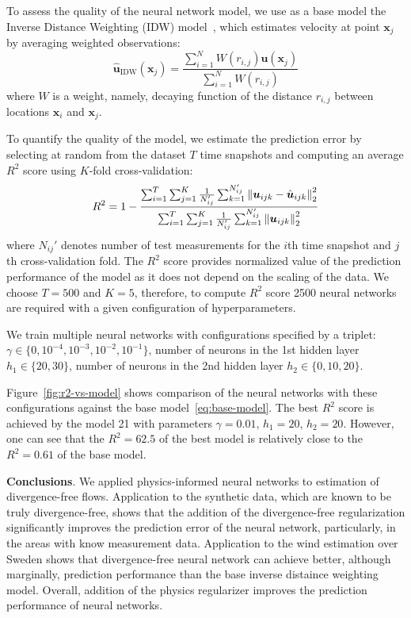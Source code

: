 \documentclass[pamm,a4paper,fleqn]{w-art}
\renewcommand{\vec}[1]{\boldsymbol{#1}}
\newcommand{\norm}[1]{\left\lVert#1\right\rVert}
\begin{document}
To assess the quality of the neural network model, we use as a base model the
Inverse Distance Weighting (IDW)
model~\cite{Cellura2008}, which
estimates velocity at point $\vec x_j$ by averaging weighted observations:
\begin{equation}
  \label{eq:base-model}
  \hat{\vec u}_{\text{IDW}}(\vec x_j) =
  \frac{\sum_{i=1}^N W(r_{i,j}) \vec u(\vec x_j)}{\sum_{i=1}^N W(r_{i,j})}
\end{equation}
where $W$ is a weight, namely, decaying function of the distance $r_{i, j}$
between locations $\vec x_i$ and $\vec x_j$.

To quantify the quality of the model, we estimate the prediction error
by selecting at random from the dataset $T$ time snapshots and computing
an average $R^2$ score using $K$-fold cross-validation:
\[
  R^2 = 1 - \frac{%
    \sum_{i=1}^T \sum_{j=1}^K \frac{1}{N_{ij}'}
    \sum_{k=1}^{N_{ij}'} \norm{\vec{u}_{ijk} - \hat{\vec{u}}_{ijk}}^2_2}
  {%
    \sum_{i=1}^T \sum_{j=1}^K \frac{1}{N_{ij}'}
    \sum_{k=1}^{N_{ij}'} \norm{\vec{u}_{ijk}}^2_2}
\]
where $N_{ij}'$ denotes number of test measurements for the $i$th time snapshot
and $j$th cross-validation fold.
The $R^2$ score provides normalized value of the prediction performance of the
model as it does not depend on the scaling of the data.
We choose $T=500$ and $K=5$, therefore, to compute $R^2$ score 2500 neural
networks are required with a given configuration of hyperparameters.

We train multiple neural networks with configurations specified by a triplet: 
$\gamma \in \{0, 10^{-4}, 10^{-3}, 10^{-2}, 10^{-1}\}$, 
number of neurons in the 1st hidden layer $h_1 \in \{20, 30\}$,
number of neurons in the 2nd hidden layer $h_2 \in \{0, 10, 20\}$.

Figure~\ref{fig:r2-vs-model} shows comparison of the neural networks with these
configurations against the base model~\eqref{eq:base-model}.
The best $R^2$ score is achieved by the model 21 with parameters $\gamma=0.01$,
$h_1=20$, $h_2=20$.
However, one can see that the $R^2=62.5$ of the best model is relatively close
to the $R^2=0.61$ of the base model.

\textbf{Conclusions}.
We applied physics-informed neural networks to estimation of divergence-free
flows.
Application to the synthetic data, which are known to be truly divergence-free,
shows that the addition of the divergence-free regularization significantly
improves the prediction error of the neural network, particularly, in the areas
with know measurement data.
Application to the wind estimation over Sweden shows that divergence-free neural
network can achieve better, although marginally, prediction performance than
the base inverse distaince weighting model.
Overall, addition of the physics regularizer improves the prediction performance
of neural networks.
\end{document}
